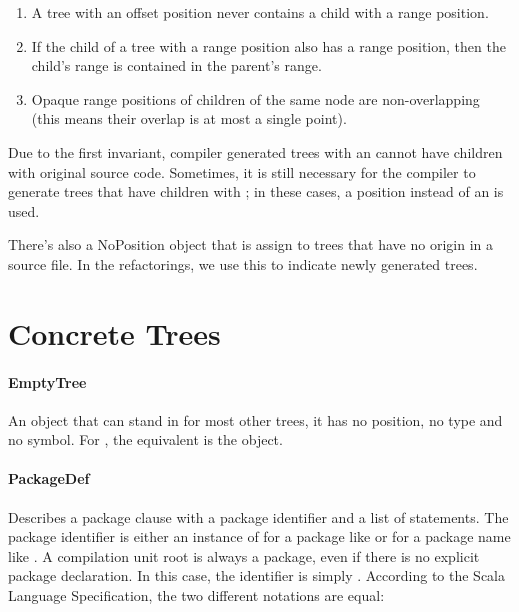 \begin{enumerate}
  \item A tree with an offset position never contains a child with a range position.
  \item If the child of a tree with a range position also has a range position, then the child's range is contained in the parent's range.
  \item Opaque range positions of children of the same node are non-overlapping (this means their overlap is at most a single point).
\end{enumerate}

Due to the first invariant, compiler generated trees with an  cannot have children with original source code. Sometimes, it is still necessary for the compiler to generate trees that have children with ; in these cases, a  position instead of an  is used.

There's also a NoPosition object that is assign to trees that have no origin in a source file. In the refactorings, we use this to indicate newly generated trees.

\section{Concrete Trees}

\paragraph{EmptyTree} \hfill \begin{footnotesize}\end{footnotesize} \newline

\noindent An object that can stand in for most other trees, it has no position, no type and no symbol. For , the equivalent is the  object.

\paragraph{PackageDef} 

\noindent Describes a package clause with a package identifier and a list of statements. The package identifier is either an instance of  for a package like  or  for a package name like . A compilation unit root is always a package, even if there is no explicit package declaration. In this case, the identifier is simply . According to the Scala Language Specification, the two different notations are equal:

